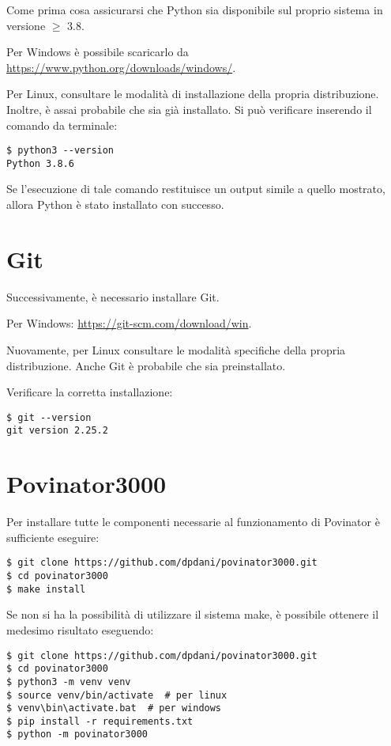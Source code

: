 \documentclass[12pt]{report}
\begin{document}
Come prima cosa assicurarsi che Python sia disponibile sul proprio
sistema in versione \(\geq\) 3.8.

Per Windows è possibile scaricarlo da
\url{https://www.python.org/downloads/windows/}.

Per Linux, consultare le modalità di installazione della propria
distribuzione. Inoltre, è assai probabile che sia già installato. Si può
verificare inserendo il comando da terminale:

\begin{verbatim}
$ python3 --version
Python 3.8.6
\end{verbatim}

Se l'esecuzione di tale comando restituisce un output simile a quello
mostrato, allora Python è stato installato con successo.

\section{Git}\label{git}

Successivamente, è necessario installare Git.

Per Windows: \url{https://git-scm.com/download/win}.

Nuovamente, per Linux consultare le modalità specifiche della propria distribuzione.
Anche Git è probabile che sia preinstallato.

Verificare la corretta installazione:

\begin{verbatim}
$ git --version
git version 2.25.2
\end{verbatim}

\section{Povinator3000}\label{povinator3000}

Per installare tutte le componenti necessarie al funzionamento di Povinator è sufficiente eseguire:

\begin{verbatim}
$ git clone https://github.com/dpdani/povinator3000.git
$ cd povinator3000
$ make install
\end{verbatim}

Se non si ha la possibilità di utilizzare il sistema make, è possibile ottenere il medesimo risultato eseguendo:

\begin{verbatim}
$ git clone https://github.com/dpdani/povinator3000.git
$ cd povinator3000
$ python3 -m venv venv
$ source venv/bin/activate  # per linux
$ venv\bin\activate.bat  # per windows
$ pip install -r requirements.txt
$ python -m povinator3000
\end{verbatim}
\end{document}
